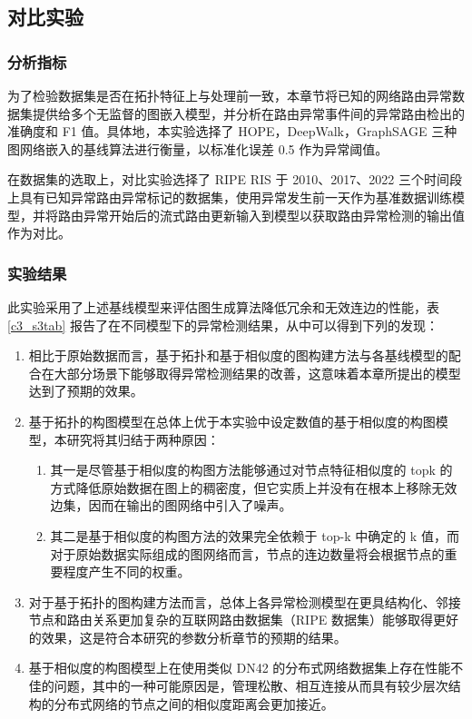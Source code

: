 \subsection{对比实验}

\subsubsection{分析指标}

为了检验数据集是否在拓扑特征上与处理前一致，本章节将已知的网络路由异常数据集提供给多个无监督的图嵌入模型，并分析在路由异常事件间的异常路由检出的准确度和 F1 值。具体地，本实验选择了 HOPE，DeepWalk，GraphSAGE 三种图网络嵌入的基线算法进行衡量，以标准化误差 0.5 作为异常阈值。

在数据集的选取上，对比实验选择了 RIPE RIS 于 2010、2017、2022 三个时间段上具有已知异常路由异常标记的数据集，使用异常发生前一天作为基准数据训练模型，并将路由异常开始后的流式路由更新输入到模型以获取路由异常检测的输出值作为对比。

\subsubsection{实验结果}

此实验采用了上述基线模型来评估图生成算法降低冗余和无效连边的性能，表 \ref{c3_s3tab} 报告了在不同模型下的异常检测结果，从中可以得到下列的发现：

\begin{enumerate}
    \item 相比于原始数据而言，基于拓扑和基于相似度的图构建方法与各基线模型的配合在大部分场景下能够取得异常检测结果的改善，这意味着本章所提出的模型达到了预期的效果。
    \item 基于拓扑的构图模型在总体上优于本实验中设定数值的基于相似度的构图模型，本研究将其归结于两种原因：
          \begin{enumerate}
              \item 其一是尽管基于相似度的构图方法能够通过对节点特征相似度的 topk 的方式降低原始数据在图上的稠密度，但它实质上并没有在根本上移除无效边集，因而在输出的图网络中引入了噪声。
              \item 其二是基于相似度的构图方法的效果完全依赖于 top-k 中确定的 k 值，而对于原始数据实际组成的图网络而言，节点的连边数量将会根据节点的重要程度产生不同的权重。
          \end{enumerate}
    \item 对于基于拓扑的图构建方法而言，总体上各异常检测模型在更具结构化、邻接节点和路由关系更加复杂的互联网路由数据集（RIPE 数据集）能够取得更好的效果，这是符合本研究的参数分析章节的预期的结果。
    \item 基于相似度的构图模型上在使用类似 DN42 的分布式网络数据集上存在性能不佳的问题，其中的一种可能原因是，管理松散、相互连接从而具有较少层次结构的分布式网络的节点之间的相似度距离会更加接近。
\end{enumerate}

